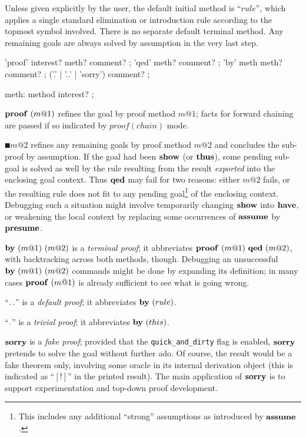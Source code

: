 \medskip

Unless given explicitly by the user, the default initial method is ``$rule$'',
which applies a single standard elimination or introduction rule according to
the topmost symbol involved.  There is no separate default terminal method.
Any remaining goals are always solved by assumption in the very last step.

\begin{rail}
  'proof' interest? meth? comment?
  ;
  'qed' meth? comment?
  ;
  'by' meth meth? comment?
  ;
  ('.' | '..' | 'sorry') comment?
  ;

  meth: method interest?
  ;
\end{rail}

\begin{descr}
\item [$\PROOF{m@1}$] refines the goal by proof method $m@1$; facts for
  forward chaining are passed if so indicated by $proof(chain)$ mode.
\item [$\QED{m@2}$] refines any remaining goals by proof method $m@2$ and
  concludes the sub-proof by assumption.  If the goal had been ${\mathord{\mathbf{show}}}$ (or
  ${\mathord{\mathbf{thus}}}$), some pending sub-goal is solved as well by the rule resulting
  from the result \emph{exported} into the enclosing goal context.  Thus
  ${\mathord{\mathbf{qed}}}$ may fail for two reasons: either $m@2$ fails, or the resulting
  rule does not fit to any pending goal\footnote{This includes any additional
    ``strong'' assumptions as introduced by ${\mathord{\mathbf{assume}}}$.} of the enclosing
  context.  Debugging such a situation might involve temporarily changing
  ${\mathord{\mathbf{show}}}$ into ${\mathord{\mathbf{have}}}$, or weakening the local context by replacing
  some occurrences of ${\mathord{\mathbf{assume}}}$ by ${\mathord{\mathbf{presume}}}$.
\item [$\BYY{m@1}{m@2}$] is a \emph{terminal proof}; it
  abbreviates $\PROOF{m@1}~\QED{m@2}$, with backtracking across both methods,
  though.  Debugging an unsuccessful $\BYY{m@1}{m@2}$ commands might be done
  by expanding its definition; in many cases $\PROOF{m@1}$ is already
  sufficient to see what is going wrong.
\item [``${\mathord{\mathbf{.\,.}}}$''] is a \emph{default proof}; it
  abbreviates $\BY{rule}$.
\item [``${\mathord{\mathbf{.}}}$''] is a \emph{trivial proof}; it
  abbreviates $\BY{this}$.
\item [${\mathord{\mathbf{sorry}}}$] is a \emph{fake proof}; provided that the
  \texttt{quick_and_dirty} flag is enabled, ${\mathord{\mathbf{sorry}}}$ pretends to solve the
  goal without further ado.  Of course, the result would be a fake theorem
  only, involving some oracle in its internal derivation object (this is
  indicated as ``$[!]$'' in the printed result).  The main application of
  ${\mathord{\mathbf{sorry}}}$ is to support experimentation and top-down proof development.
\end{descr}


